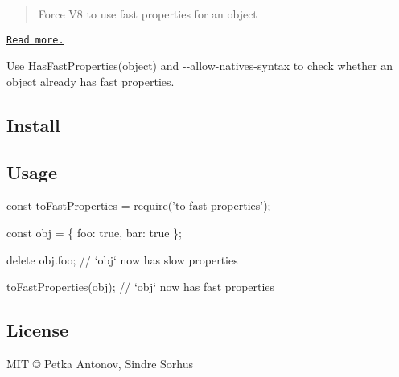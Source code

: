 \begin{quote}
Force V8 to use fast properties for an object \end{quote}


\href{http://stackoverflow.com/questions/24987896/}{\tt Read more.}

Use {\ttfamily Has\+Fast\+Properties(object)} and {\ttfamily -\/-\/allow-\/natives-\/syntax} to check whether an object already has fast properties.

\subsection*{Install}




\subsection*{Usage}


\begin{DoxyCode}
const toFastProperties = require('to-fast-properties');

const obj = \{
  foo: true,
  bar: true
\};

delete obj.foo;
// `obj` now has slow properties

toFastProperties(obj);
// `obj` now has fast properties
\end{DoxyCode}


\subsection*{License}

M\+IT © Petka Antonov, Sindre Sorhus 